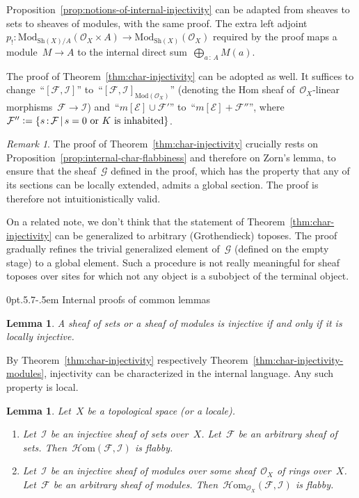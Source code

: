 \documentclass[10pt,reqno,a4paper]{amsbook}
\makeatletter
\theoremstyle{definition}
\theoremstyle{plain}
\newtheorem{lemma}[defn]{Lemma}
\theoremstyle{remark}
\newtheorem{rem}[defn]{Remark}
\newcommand{\E}{\mathcal{E}}
\newcommand{\F}{\mathcal{F}}
\newcommand{\G}{\mathcal{G}}
\renewcommand{\O}{\mathcal{O}}
\newcommand{\I}{\mathcal{I}}
\newcommand{\HOM}{\mathcal{H}\mathrm{om}}
\newcommand{\Sh}{\mathrm{Sh}}
\newcommand{\Mod}{\mathrm{Mod}}
\newcommand{\?}{\,{:}\,}
\renewcommand{\_}{\mathpunct{.}\,}
\newcommand{\defeq}{\vcentcolon=}
\renewenvironment{proof}[1][\proofname]{\par
  \pushQED{\qed}%
  \normalfont \topsep6\p@\@plus6\p@\relax
  \trivlist
  \item[\hskip\labelsep
        \itshape
    #1\@addpunct{.}]\ignorespaces
}{%
  \popQED\endtrivlist\@endpefalse
}
\def\subsection{\@startsection{subsection}{2}%
  {0pt}{.5\linespacing\@plus.7\linespacing}{-.5em}%
  {\normalfont\bfseries}}
\makeatother
\begin{document}
\begin{proof}Proposition~\ref{prop:notions-of-internal-injectivity} can be
adapted from sheaves to sets to sheaves of modules, with the same proof.
The extra left adjoint~$p_! : \Mod_{\Sh(X)/A}(\O_X \times A) \to
\Mod_{\Sh(X)}(\O_X)$ required by the proof maps a module~$M \to A$ to the
internal direct sum~$\bigoplus_{a \? A} M(a)$.

The proof of Theorem~\ref{thm:char-injectivity} can be adopted as well.
It suffices to change~``$[\F, \I]$'' to~``$[\F,\I]_{\Mod(\O_X)}$'' (denoting
the Hom sheaf of~$\O_X$-linear morphisms~$\F \to \I$)
and~``$m[\E] \cup \F'$'' to~``$m[\E] + \F''$'', where~$\F''
\defeq \{ s \? \F \,|\, \text{$s = 0$ or $K$ is inhabited} \}$.
\end{proof}

\begin{rem}The proof of Theorem~\ref{thm:char-injectivity} crucially rests on
Proposition~\ref{prop:internal-char-flabbiness} and therefore on Zorn's lemma,
to ensure that the sheaf~$\G$ defined in the proof, which has the property that
any of its sections can be locally extended, admits a global section. The proof
is therefore not intuitionistically valid.

On a related note, we don't think that the statement of
Theorem~\ref{thm:char-injectivity} can be generalized to arbitrary
(Grothendieck) toposes. The proof gradually refines the trivial
generalized element of~$\G$ (defined on the empty stage) to a global element.
Such a procedure is not really meaningful for sheaf toposes over sites for
which not any object is a subobject of the terminal object.
\end{rem}


\subsection{Internal proofs of common lemmas}

\begin{lemma}A sheaf of sets or a sheaf of modules is injective if and only if it
is locally injective.\end{lemma}

\begin{proof}By Theorem~\ref{thm:char-injectivity} respectively
Theorem~\ref{thm:char-injectivity-modules}, injectivity can be characterized in the
internal language. Any such property is local.\end{proof}

\begin{lemma}Let~$X$ be a topological space (or a locale).
\begin{enumerate}
\item Let~$\I$ be an injective sheaf of sets over~$X$. Let~$\F$ be an arbitrary
sheaf of sets. Then~$\HOM(\F,\I)$ is flabby.
\item Let~$\I$ be an injective sheaf of modules over some sheaf~$\O_X$ of rings
over~$X$. Let~$\F$ be an arbitrary sheaf of modules.
Then~$\HOM_{\O_X}(\F,\I)$ is flabby.
\end{enumerate}
\end{lemma}
\end{document}
